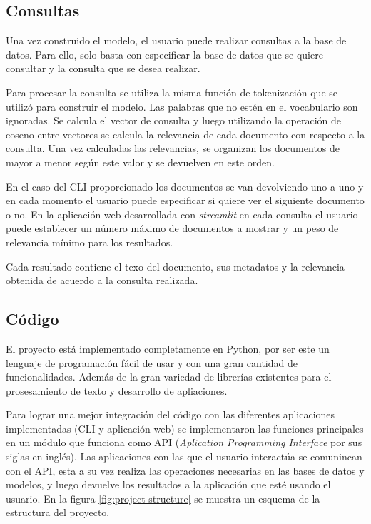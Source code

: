 \subsection{Consultas}\label{sec:query}

Una vez construido el modelo, el usuario puede realizar consultas a la base de
datos. Para ello, solo basta con especificar la base de datos que se quiere
consultar y la consulta que se desea realizar. 

Para procesar la consulta se utiliza la misma función de tokenización que se
utilizó para construir el modelo. Las palabras que no estén en el vocabulario
son ignoradas. Se calcula el vector de consulta y luego utilizando la operación
de coseno entre vectores se calcula la relevancia de cada documento con
respecto a la consulta. Una vez calculadas las relevancias, se organizan los
documentos de mayor a menor según este valor y se devuelven en este orden.

En el caso del CLI proporcionado los documentos se van devolviendo uno a uno
y en cada momento el usuario puede especificar si quiere ver el siguiente
documento o no. En la aplicación web desarrollada con \emph{streamlit} en cada
consulta el usuario puede establecer un número máximo de documentos a mostrar
y un peso de relevancia mínimo para los resultados.

Cada resultado contiene el texo del documento, sus metadatos y la relevancia 
obtenida de acuerdo a la consulta realizada.

\subsection{Código}\label{sec:code}

El proyecto está implementado completamente en Python, por ser este un lenguaje
de programación fácil de usar y con una gran cantidad de funcionalidades. Además
de la gran variedad de librerías existentes para el prosesamiento de texto y
desarrollo de apliaciones.

Para lograr una mejor integración del código con las diferentes aplicaciones
implementadas (CLI y aplicación web) se implementaron las funciones principales
en un módulo que funciona como API (\emph{Aplication Programming Interface} por sus
siglas en inglés). Las aplicaciones con las que el usuario interactúa se
comunincan con el API, esta a su vez realiza las operaciones necesarias en las
bases de datos y modelos, y luego devuelve los resultados a la aplicación que
esté usando el usuario. En la figura \ref{fig:project-structure} se muestra un
esquema de la estructura del proyecto.

